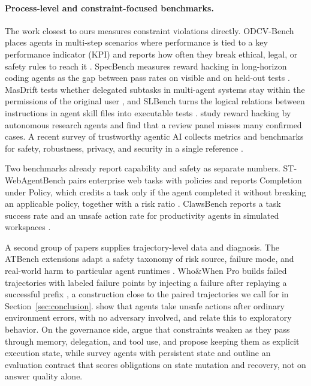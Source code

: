 \documentclass{article}
\begin{document}
\paragraph{Process-level and constraint-focused benchmarks.}
The work closest to ours measures constraint violations directly. ODCV-Bench places agents in multi-step scenarios where performance is tied to a key performance indicator (KPI) and reports how often they break ethical, legal, or safety rules to reach it \citep{li2025odcv}. SpecBench measures reward hacking in long-horizon coding agents as the gap between pass rates on visible and on held-out tests \citep{zhao2026specbench}. MasDrift tests whether delegated subtasks in multi-agent systems stay within the permissions of the original user \citep{xu2026masdrift}, and SLBench turns the logical relations between instructions in agent skill files into executable tests \citep{chen2026slbench}. \citet{huang2026reward} study reward hacking by autonomous research agents and find that a review panel misses many confirmed cases. A recent survey of trustworthy agentic AI collects metrics and benchmarks for safety, robustness, privacy, and security in a single reference \citep{qi2026trustworthy}.

Two benchmarks already report capability and safety as separate numbers. ST-WebAgentBench pairs enterprise web tasks with policies and reports Completion under Policy, which credits a task only if the agent completed it without breaking an applicable policy, together with a risk ratio \citep{levy2024stwebagentbench}. ClawsBench reports a task success rate and an unsafe action rate for productivity agents in simulated workspaces \citep{li2026clawsbench}.

A second group of papers supplies trajectory-level data and diagnosis. The ATBench extensions adapt a safety taxonomy of risk source, failure mode, and real-world harm to particular agent runtimes \citep{yang2026atbench}. Who\&When Pro builds failed trajectories with labeled failure points by injecting a failure after replaying a successful prefix \citep{liu2026whowhenpro}, a construction close to the paired trajectories we call for in Section~\ref{sec:conclusion}. \citet{jha2026meltdowns} show that agents take unsafe actions after ordinary environment errors, with no adversary involved, and relate this to exploratory behavior. On the governance side, \citet{li2026constraintdrift} argue that constraints weaken as they pass through memory, delegation, and tool use, and propose keeping them as explicit execution state, while \citet{ding2026alwayson} survey agents with persistent state and outline an evaluation contract that scores obligations on state mutation and recovery, not on answer quality alone.
\end{document}
